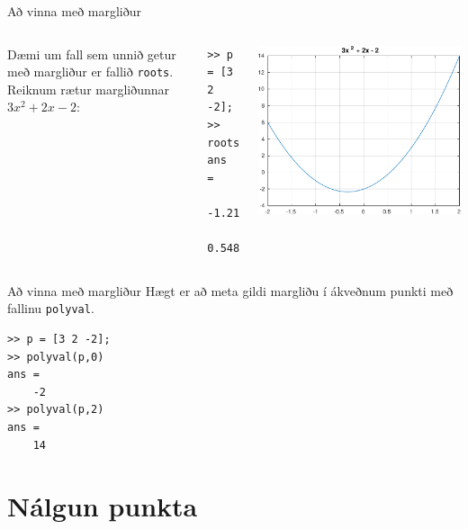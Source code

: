 \documentclass[handout]{beamer}
\begin{document}
\begin{frame}[fragile]{Að vinna með margliður}
\begin{columns}
Dæmi um fall sem unnið getur með margliður er fallið \texttt{roots}. Reiknum rætur margliðunnar $3x^2 + 2x - 2$:
\begin{verbatim}
>> p = [3 2 -2];
>> roots(p)
ans =
   -1.2153
    0.5486
\end{verbatim}
\includegraphics[width=\linewidth]{Pics/poly-example}
\end{columns}
\end{frame}

\begin{frame}[fragile]{Að vinna með margliður}
Hægt er að meta gildi margliðu í ákveðnum punkti með fallinu \texttt{polyval}.
\begin{verbatim}
>> p = [3 2 -2];
>> polyval(p,0)
ans =
    -2
>> polyval(p,2)
ans =
    14
\end{verbatim}
\end{frame}

\section{Nálgun punkta}
\end{document}
